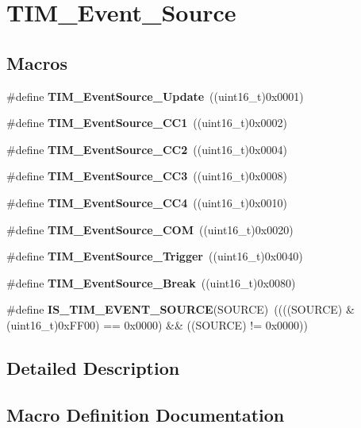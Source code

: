 \section{T\+I\+M\+\_\+\+Event\+\_\+\+Source}
\label{group__TIM__Event__Source}
\subsection*{Macros}
\begin{DoxyCompactItemize}
\item 
\#define \textbf{ T\+I\+M\+\_\+\+Event\+Source\+\_\+\+Update}~((uint16\+\_\+t)0x0001)
\item 
\#define \textbf{ T\+I\+M\+\_\+\+Event\+Source\+\_\+\+C\+C1}~((uint16\+\_\+t)0x0002)
\item 
\#define \textbf{ T\+I\+M\+\_\+\+Event\+Source\+\_\+\+C\+C2}~((uint16\+\_\+t)0x0004)
\item 
\#define \textbf{ T\+I\+M\+\_\+\+Event\+Source\+\_\+\+C\+C3}~((uint16\+\_\+t)0x0008)
\item 
\#define \textbf{ T\+I\+M\+\_\+\+Event\+Source\+\_\+\+C\+C4}~((uint16\+\_\+t)0x0010)
\item 
\#define \textbf{ T\+I\+M\+\_\+\+Event\+Source\+\_\+\+C\+OM}~((uint16\+\_\+t)0x0020)
\item 
\#define \textbf{ T\+I\+M\+\_\+\+Event\+Source\+\_\+\+Trigger}~((uint16\+\_\+t)0x0040)
\item 
\#define \textbf{ T\+I\+M\+\_\+\+Event\+Source\+\_\+\+Break}~((uint16\+\_\+t)0x0080)
\item 
\#define \textbf{ I\+S\+\_\+\+T\+I\+M\+\_\+\+E\+V\+E\+N\+T\+\_\+\+S\+O\+U\+R\+CE}(S\+O\+U\+R\+CE)~((((S\+O\+U\+R\+CE) \& (uint16\+\_\+t)0x\+F\+F00) == 0x0000) \&\& ((\+S\+O\+U\+R\+C\+E) != 0x0000))
\end{DoxyCompactItemize}


\subsection{Detailed Description}


\subsection{Macro Definition Documentation}
\mbox{\label{group__TIM__Event__Source_ga4ac88c3e43c8250114ea81a6e052d58a}} 
